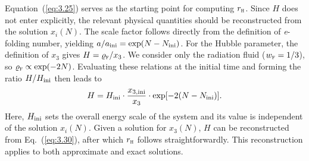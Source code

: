 \documentclass[aps,prd,twocolumn]{revtex4-2}
\newcommand\subF{\textsc{f}}
\newcommand\subH{\textsc{h}}
\newcommand\subini{{\rm ini}}
\begin{document}
Equation~(\ref{eq:3.25}) serves as the starting point for computing $r_\subH$. Since $H$ does not enter explicitly, the relevant physical quantities should be reconstructed from the solution $x_i(N)$. The scale factor follows directly from the definition of \textit{e}-folding number, yielding $a/a_\subini=\exp(N-N_\subini)$. For the Hubble parameter, the definition of $x_3$ gives $H = \varrho_\subF/x_3$. We consider only the radiation fluid ($w_\subF=1/3$), so $\varrho_\subF\propto\exp(-2N)$. Evaluating these relations at the initial time and forming the ratio $H/H_\subini$ then leads to
\begin{equation}\label{eq:3.30}
  H = H_\subini \cdot \frac{x_{3,\subini}}{x_3} \cdot \exp[-2(N-N_\subini)].
\end{equation}
Here, $H_\subini$ sets the overall energy scale of the system and its value is independent of the solution $x_i(N)$. Given a solution for $x_3(N)$, $H$ can be reconstructed from Eq.~(\ref{eq:3.30}), after which $r_\subH$ follows straightforwardly. This reconstruction applies to both approximate and exact solutions.
\end{document}
